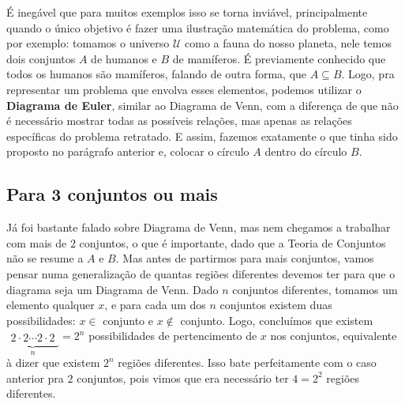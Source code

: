 
  É inegável que para muitos exemplos isso se torna inviável, principalmente quando o único objetivo é fazer uma ilustração matemática do problema, como por exemplo: tomamos o universo $\mathcal U$ como a fauna do nosso planeta, nele temos dois conjuntos $A$ de humanos e $B$ de mamíferos. É previamente conhecido que todos os humanos são mamíferos, falando de outra forma, que $A \subseteq B$. Logo, pra representar um problema que envolva esses elementos, podemos utilizar o \textbf{Diagrama de Euler}, similar ao Diagrama de Venn, com a diferença de que não é necessário mostrar todas as possíveis relações, mas apenas as relações específicas do problema retratado. E assim, fazemos exatamente o que tinha sido proposto no parágrafo anterior e, colocar o círculo $A$ dentro do círculo $B$.


  \subsection{Para 3 conjuntos ou mais}
  Já foi bastante falado sobre Diagrama de Venn, mas nem chegamos a trabalhar com mais de $2$ conjuntos, o que é importante, dado que a Teoria de Conjuntos não se resume a $A$ e $B$. Mas antes de partirmos para mais conjuntos, vamos pensar numa generalização de quantas regiões diferentes devemos ter para que o diagrama seja um Diagrama de Venn. Dado $n$ conjuntos diferentes, tomamos um elemento qualquer $x$, e para cada um dos $n$ conjuntos existem duas possibilidades: $x \in $ conjunto e $x \notin $ conjunto. Logo, concluímos que existem $\underbrace{\begin{matrix} 2\cdot2\cdots2\cdot2\end{matrix}}_{n} = 2^n$ possibilidades de pertencimento de $x$ nos conjuntos, equivalente à dizer que existem $2^n$ regiões diferentes. Isso bate perfeitamente com o caso anterior pra $2$ conjuntos, pois vimos que era necessário ter $4=2^2$ regiões diferentes.

